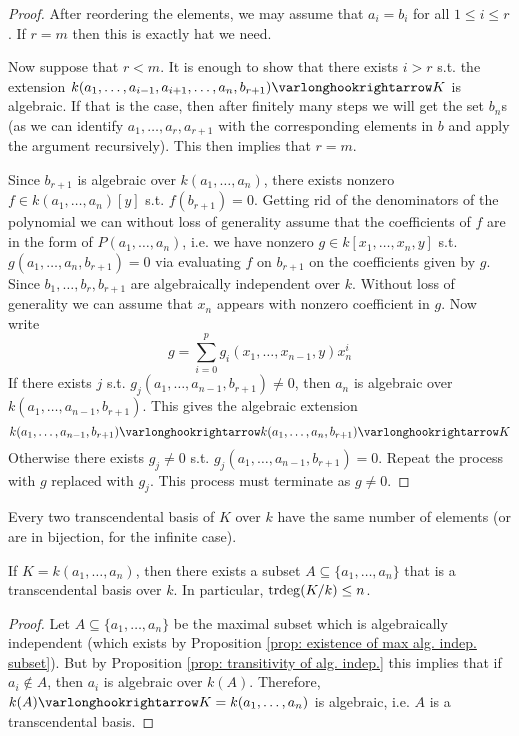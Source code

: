 \documentclass{article}
\begin{document}
\begin{proof}
    After reordering the elements, we may assume that $a_i = b_i$ for all $1 \leq i \leq r$. If $r = m$ then this is exactly hat we need.

    Now suppose that $r < m$. It is enough to show that there exists $i > r$ s.t. the extension $k(a_1, \dots, a_{i-1}, a_{i+1}, \dots, a_n, b_{r+1}) \ext K$ is algebraic. If that is the case, then after finitely many steps we will get the set $b_n$s (as we can identify $a_1, \dots, a_r, a_{r+1}$ with the corresponding elements in $b$ and apply the argument recursively). This then implies that $r = m$.

    Since $b_{r+1}$ is algebraic over $k(a_1, \dots, a_n)$, there exists nonzero $f \in k(a_1, \dots, a_n)[y]$ s.t. $f(b_{r+1}) = 0$. Getting rid of the denominators of the polynomial we can without loss of generality assume that the coefficients of $f$ are in the form of $P(a_1, \dots, a_n)$, i.e. we have nonzero $g \in k[x_1, \dots, x_n, y]$ s.t. $g(a_1, \dots, a_n, b_{r+1}) = 0$ via evaluating $f$ on $b_{r+1}$ on the coefficients given by $g$. Since $b_1, \dots, b_{r}, b_{r+1}$ are algebraically independent over $k$. Without loss of generality we can assume that $x_n$ appears with nonzero coefficient in $g$. Now write
    \[
        g = \sum_{i = 0}^p g_i(x_1, \dots, x_{n-1}, y) x_n^i
    \]
    If there exists $j$ s.t. $g_j(a_1, \dots, a_{n-1}, b_{r+1}) \neq 0$, then $a_n$ is algebraic over $k(a_1, \dots, a_{n-1}, b_{r+1})$. This gives the algebraic extension
    \[
        k(a_1, \dots, a_{n-1}, b_{r+1}) \ext k(a_1, \dots, a_n, b_{r+1}) \ext K
    \]
    Otherwise there exists $g_j \neq 0$ s.t. $g_j(a_1, \dots, a_{n-1}, b_{r+1}) = 0$. Repeat the process with $g$ replaced with $g_j$. This process must terminate as $g \neq 0$.
\end{proof}

\begin{corollary}
    Every two transcendental basis of $K$ over $k$ have the same number of elements (or are in bijection, for the infinite case).
\end{corollary}

\begin{proposition}
    If $K = k(a_1, \dots, a_n)$, then there exists a subset $A \subseteq \{a_1, \dots, a_n\}$ that is a transcendental basis over $k$. In particular, $\operatorname{trdeg}(K/k) \leq n$.
\end{proposition}

\begin{proof}
    Let $A \subseteq \{a_1, \dots, a_n\}$ be the maximal subset which is algebraically independent (which exists by Proposition \ref{prop: existence of max alg. indep. subset}). But by Proposition \ref{prop: transitivity of alg. indep.} this implies that if $a_i \notin A$, then $a_i$ is algebraic over $k(A)$. Therefore, $k(A) \ext K = k(a_1, \dots, a_n)$ is algebraic, i.e. $A$ is a transcendental basis. 
\end{proof}
\end{document}
